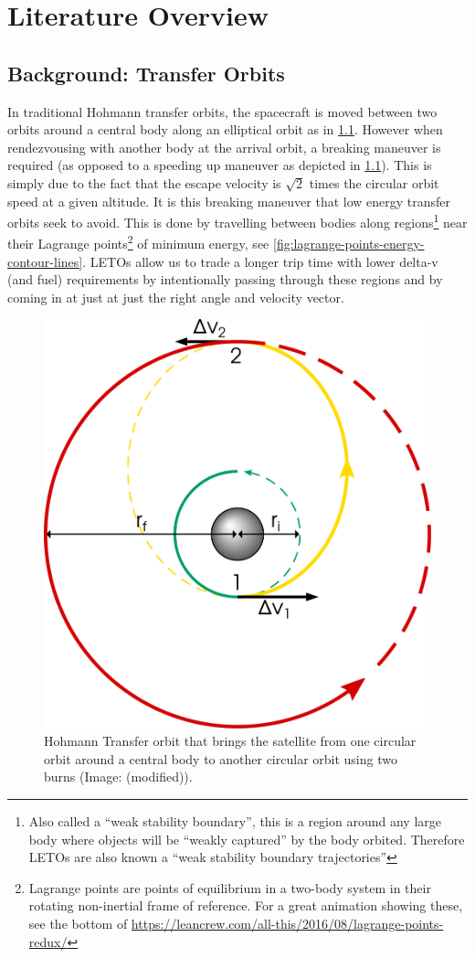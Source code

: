 
\chapter{Literature Overview}
\section{Background: Transfer Orbits}
In traditional Hohmann transfer orbits, the spacecraft is moved between two orbits around a central body along an elliptical orbit as in \cref{fig:hohmann}. However when rendezvousing with another body at the arrival orbit, a breaking maneuver is required (as opposed to a speeding up maneuver as depicted in \cref{fig:hohmann}). This is simply due to the fact that the escape velocity is $\sqrt{2}$ times the circular orbit speed at a given altitude. It is this breaking maneuver that low energy transfer orbits seek to avoid. This is done by travelling between bodies along regions\footnote{Also called a ``weak stability boundary'', this is a region around any large body where objects will be ``weakly captured'' by the body orbited. Therefore LETOs are also known a ``weak stability boundary trajectories''} near their Lagrange points\footnote{Lagrange points are points of equilibrium in a two-body system in their rotating non-inertial frame of reference. For a great animation showing these, see the bottom of \url{https://leancrew.com/all-this/2016/08/lagrange-points-redux/}} of minimum energy, see \cref{fig:lagrange-points-energy-contour-lines}. LETOs allow us to trade a longer trip time with lower delta-v (and fuel) requirements by intentionally passing through these regions and by coming in at just at just the right angle and velocity vector.

\begin{figure}[ht]
    \centering
    \includegraphics[width=0.37\linewidth]{fig/hohmann.pdf}
    \caption{Hohmann Transfer orbit that brings the satellite from one circular orbit around a central body to another circular orbit using two burns (Image: \cite{Leafnode} (modified)).}
    \label{fig:hohmann}
\end{figure}

